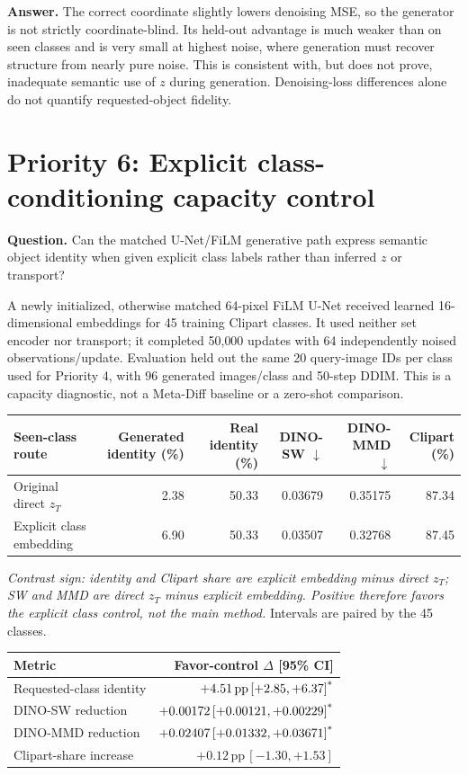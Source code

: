 \documentclass[10pt]{article}
\newcommand{\sig}{\textsuperscript{*}}
\newcommand{\pp}{\,\mathrm{pp}}
\begin{document}
\textbf{Answer.} The correct coordinate slightly lowers denoising MSE, so the generator is not strictly coordinate-blind. Its held-out advantage is much weaker than on seen classes and is very small at highest noise, where generation must recover structure from nearly pure noise. This is consistent with, but does not prove, inadequate semantic use of $z$ during generation. Denoising-loss differences alone do not quantify requested-object fidelity.

\section*{Priority 6: Explicit class-conditioning capacity control}

\textbf{Question.} Can the matched U-Net/FiLM generative path express semantic object identity when given explicit class labels rather than inferred $z$ or transport?

A newly initialized, otherwise matched 64-pixel FiLM U-Net received learned 16-dimensional embeddings for 45 training Clipart classes. It used neither set encoder nor transport; it completed 50{,}000 updates with 64 independently noised observations/update. Evaluation held out the same 20 query-image IDs per class used for Priority 4, with 96 generated images/class and 50-step DDIM. This is a capacity diagnostic, not a Meta-Diff baseline or a zero-shot comparison.

\begin{center}\small
\begin{tabular}{lrrrrr}
\toprule
Seen-class route & Generated identity (\%) & Real identity (\%) & DINO-SW $\downarrow$ & DINO-MMD $\downarrow$ & Clipart (\%)\\
\midrule
Original direct $z_T$ & 2.38 & 50.33 & 0.03679 & 0.35175 & 87.34\\
Explicit class embedding & 6.90 & 50.33 & 0.03507 & 0.32768 & 87.45\\
\bottomrule
\end{tabular}
\end{center}

\emph{Contrast sign: identity and Clipart share are explicit embedding minus direct $z_T$; SW and MMD are direct $z_T$ minus explicit embedding. Positive therefore favors the explicit class control, \emph{not} the main method.} Intervals are paired by the 45 classes.

\begin{center}\small
\begin{tabular}{lr}
\toprule
Metric & Favor-control $\Delta$ [95\% CI]\\
\midrule
Requested-class identity & $+4.51\pp\,[+2.85,+6.37]\sig$\\
DINO-SW reduction & $+0.00172\,[+0.00121,+0.00229]\sig$\\
DINO-MMD reduction & $+0.02407\,[+0.01332,+0.03671]\sig$\\
Clipart-share increase & $+0.12\pp\,[-1.30,+1.53]$\\
\bottomrule
\end{tabular}
\end{center}
\end{document}
